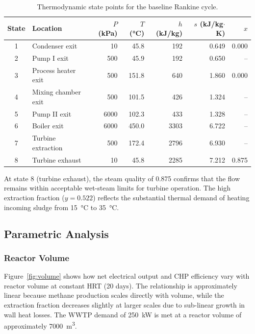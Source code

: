 \documentclass[12pt, letterpaper]{article}
\begin{document}
\begin{table}[H]
  \centering
  \caption{Thermodynamic state points for the baseline Rankine cycle.}
  \label{tab:states}
  \begin{tabular}{@{}clrrrrr@{}}
    \toprule
    \textbf{State} & \textbf{Location} & \textbf{$P$ (kPa)} & \textbf{$T$ (\si{\celsius})} & \textbf{$h$ (kJ/kg)} & \textbf{$s$ (kJ/kg$\cdot$K)} & \textbf{$x$} \\
    \midrule
    1 & Condenser exit       &    10 &  45.8 &  192 & 0.649 & 0.000 \\
    2 & Pump I exit          &   500 &  45.9 &  192 & 0.650 & -- \\
    3 & Process heater exit  &   500 & 151.8 &  640 & 1.860 & 0.000 \\
    4 & Mixing chamber exit  &   500 & 101.5 &  426 & 1.324 & -- \\
    5 & Pump II exit         &  6000 & 102.3 &  433 & 1.328 & -- \\
    6 & Boiler exit          &  6000 & 450.0 & 3303 & 6.722 & -- \\
    7 & Turbine extraction   &   500 & 172.4 & 2796 & 6.930 & -- \\
    8 & Turbine exhaust      &    10 &  45.8 & 2285 & 7.212 & 0.875 \\
    \bottomrule
  \end{tabular}
\end{table}

At state 8 (turbine exhaust), the steam quality of 0.875 confirms that the flow remains within acceptable wet-steam limits for turbine operation. The high extraction fraction ($y = 0.522$) reflects the substantial thermal demand of heating incoming sludge from \SI{15}{\celsius} to \SI{35}{\celsius}.

\subsection{Parametric Analysis}

\subsubsection{Reactor Volume}

Figure~\ref{fig:volume} shows how net electrical output and CHP efficiency vary with reactor volume at constant HRT (20 days). The relationship is approximately linear because methane production scales directly with volume, while the extraction fraction decreases slightly at larger scales due to sub-linear growth in wall heat losses. The WWTP demand of \SI{250}{\kilo\watt} is met at a reactor volume of approximately \SI{7000}{\cubic\metre}.
\end{document}
